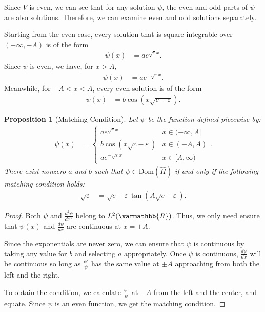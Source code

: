 \documentclass[12pt]{extarticle}
\newcommand{\R}{\varmathbb{R}}
\theoremstyle{plain}
\newtheorem*{proposition}{Proposition}%
\theoremstyle{definition}
\theoremstyle{remark}
\renewcommand{\newline}{\hfill\break}
\begin{document}
  Since $V$ is even, we can see that for any solution $\psi$, the even and odd parts of $\psi$ are also solutions. Therefore, we can examine even and odd solutions separately.\newline

  Starting from the even case, every solution that is square-integrable over $(-\infty,-A)$ is of the form
  \begin{align*}
    \psi(x) &= ae^{ \sqrt{ \varepsilon }x }.
  \end{align*}
  Since $\psi$ is even, we have, for $x > A$,
  \begin{align*}
    \psi(x) &= a e^{-\sqrt{ \varepsilon }x}.
  \end{align*}
  Meanwhile, for $-A < x < A$, every even solution is of the form
  \begin{align*}
    \psi(x) &= b \cos\left(x\sqrt{c - \varepsilon }\right).
  \end{align*}
  \begin{proposition}[Matching Condition]
    Let $\psi$ be the function defined piecewise by:
    \begin{align*}
      \psi(x) &= \begin{cases}
        ae^{\sqrt{ \varepsilon }x} & x \in (-\infty,A]\\
        b\cos\left(x\sqrt{c - \varepsilon}\right) & x\in (-A,A)\\
        ae^{-\sqrt{ \varepsilon }x} & x\in [A,\infty)
      \end{cases}.
    \end{align*}
    There exist nonzero $a$ and $b$ such that $\psi\in \text{Dom}(\hat{H})$ if and only if the following matching condition holds:
    \begin{align*}
      \sqrt{ \varepsilon} &= \sqrt{c - \varepsilon}\tan\left(A\sqrt{c - \varepsilon}\right).
    \end{align*}
  \end{proposition}
  \begin{proof}
    Both $\psi$ and $\frac{d ^2\psi}{d x^2}$ belong to $L^{2}(\R)$. Thus, we only need ensure that $\psi(x)$ and $\frac{d \psi}{d x}$ are continuous at $x = \pm A$.\newline

    Since the exponentials are never zero, we can ensure that $\psi$ is continuous by taking any value for $b$ and selecting $a$ appropriately. Once $\psi$ is continuous, $\frac{d \psi}{d x}$ will be continuous  so long as $\frac{\psi'}{\psi}$ has the same value at $\pm A$ approaching from both the left and the right.\newline

    To obtain the condition, we calculate $\frac{\psi'}{\psi}$ at $-A$ from the left and the center, and equate.  Since $\psi$ is an even function, we get the matching condition.
  \end{proof}
\end{document}
